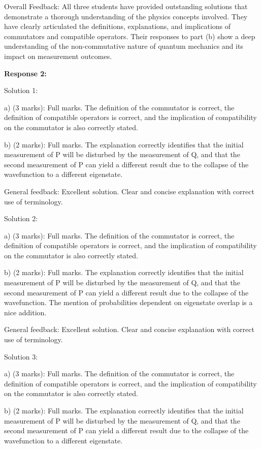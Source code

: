 \documentclass[a4paper,11pt]{article}
\begin{document}
Overall Feedback: All three students have provided outstanding solutions that demonstrate a thorough understanding of the physics concepts involved. They have clearly articulated the definitions, explanations, and implications of commutators and compatible operators. Their responses to part (b) show a deep understanding of the non-commutative nature of quantum mechanics and its impact on measurement outcomes.

\textbf{Response 2:}

Solution 1:

a) (3 marks): Full marks. The definition of the commutator is correct, the definition of compatible operators is correct, and the implication of compatibility on the commutator is also correctly stated.

b) (2 marks): Full marks. The explanation correctly identifies that the initial measurement of P will be disturbed by the measurement of Q, and that the second measurement of P can yield a different result due to the collapse of the wavefunction to a different eigenstate.

General feedback: Excellent solution. Clear and concise explanation with correct use of terminology.

Solution 2:

a) (3 marks): Full marks. The definition of the commutator is correct, the definition of compatible operators is correct, and the implication of compatibility on the commutator is also correctly stated.

b) (2 marks): Full marks. The explanation correctly identifies that the initial measurement of P will be disturbed by the measurement of Q, and that the second measurement of P can yield a different result due to the collapse of the wavefunction. The mention of probabilities dependent on eigenstate overlap is a nice addition.

General feedback: Excellent solution. Clear and concise explanation with correct use of terminology.

Solution 3:

a) (3 marks): Full marks. The definition of the commutator is correct, the definition of compatible operators is correct, and the implication of compatibility on the commutator is also correctly stated.

b) (2 marks): Full marks. The explanation correctly identifies that the initial measurement of P will be disturbed by the measurement of Q, and that the second measurement of P can yield a different result due to the collapse of the wavefunction to a different eigenstate.
\end{document}
